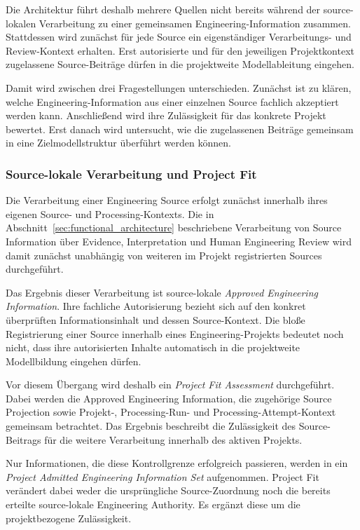 Die Architektur führt deshalb mehrere Quellen nicht bereits während der
source-lokalen Verarbeitung zu einer gemeinsamen Engineering-Information
zusammen. Stattdessen wird zunächst für jede Source ein eigenständiger
Verarbeitungs- und Review-Kontext erhalten. Erst autorisierte und für den
jeweiligen Projektkontext zugelassene Source-Beiträge dürfen in die
projektweite Modellableitung eingehen.

Damit wird zwischen drei Fragestellungen unterschieden. Zunächst ist zu klären,
welche Engineering-Information aus einer einzelnen Source fachlich akzeptiert
werden kann. Anschließend wird ihre Zulässigkeit für das konkrete Projekt
bewertet. Erst danach wird untersucht, wie die zugelassenen Beiträge gemeinsam
in eine Zielmodellstruktur überführt werden können.


\subsubsection{Source-lokale Verarbeitung und Project Fit}
\label{sec:source_local_project_fit}

Die Verarbeitung einer Engineering Source erfolgt zunächst innerhalb ihres
eigenen Source- und Processing-Kontexts. Die in
Abschnitt~\ref{sec:functional_architecture} beschriebene Verarbeitung von
Source Information über Evidence, Interpretation und Human Engineering Review
wird damit zunächst unabhängig von weiteren im Projekt registrierten Sources
durchgeführt.

Das Ergebnis dieser Verarbeitung ist source-lokale
\emph{Approved Engineering Information}. Ihre fachliche Autorisierung bezieht
sich auf den konkret überprüften Informationsinhalt und dessen Source-Kontext.
Die bloße Registrierung einer Source innerhalb eines Engineering-Projekts
bedeutet noch nicht, dass ihre autorisierten Inhalte automatisch in die
projektweite Modellbildung eingehen dürfen.

Vor diesem Übergang wird deshalb ein \emph{Project Fit Assessment}
durchgeführt. Dabei werden die Approved Engineering Information, die
zugehörige Source Projection sowie Projekt-, Processing-Run- und
Processing-Attempt-Kontext gemeinsam betrachtet. Das Ergebnis beschreibt die
Zulässigkeit des Source-Beitrags für die weitere Verarbeitung innerhalb des
aktiven Projekts.

Nur Informationen, die diese Kontrollgrenze erfolgreich passieren, werden in
ein \emph{Project Admitted Engineering Information Set} aufgenommen. Project
Fit verändert dabei weder die ursprüngliche Source-Zuordnung noch die bereits
erteilte source-lokale Engineering Authority. Es ergänzt diese um die
projektbezogene Zulässigkeit.

